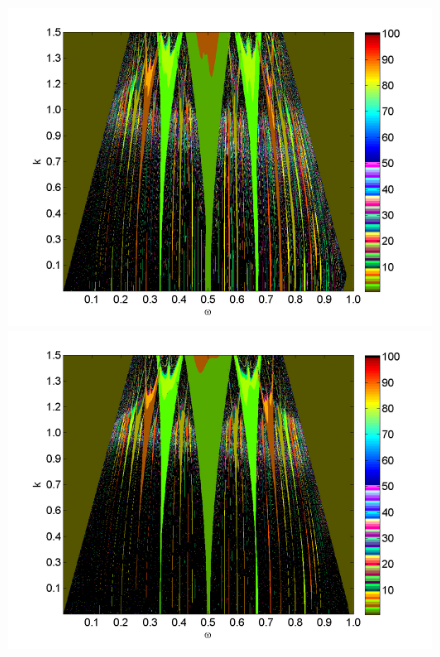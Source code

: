 \begin{figure}[H]
\includegraphics[width=.5\textwidth]{figs/tongues_norm_halfa_1000_L_05.png}\hfill
\includegraphics[width=.5\textwidth]{figs/tongues_norm_halfa_1000_L_09.png}\\
\end{figure}


